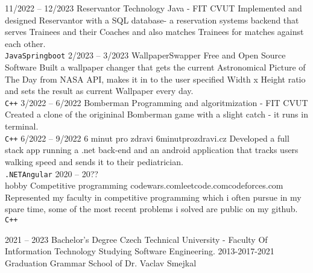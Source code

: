 \documentclass[9pt]{developercv} %
\begin{document}
\begin{entrylist}
	\entry
		{11/2022 -- 12/2023}
		{Reservantor}
		{Technology Java - FIT CVUT}
		{Implemented and designed Reservantor with a SQL database- a reservation systems backend that serves Trainees and their Coaches and also matches Trainees for matches against each other.\\ \texttt{Java}\slashsep\texttt{Springboot}}
	\entry
		{2/2023 -- 3/2023}
		{WallpaperSwapper}
		{Free and Open Source Software}
		{Built a wallpaper changer that gets the current Astronomical Picture of The Day from NASA API, makes it in to the user specified Width x Height ratio and sets the result as current Wallpaper every day.\\ \texttt{C++}}
		\entry
		{3/2022 -- 6/2022}
		{Bomberman}
		{Programming and algoritmization - FIT CVUT}
		{Created a clone of the origininal Bomberman game with a slight catch - it runs in terminal.\\ \texttt{C++}}
	\entry
		{6/2022 -- 9/2022}
		{6 minut pro zdravi}
		{6minutprozdravi.cz}
		{Developed a full stack app running a .net back-end and an android application that tracks users walking speed and sends it to their pediatrician.\\ \texttt{.NET}\slashsep\texttt{Angular}}
	\entry
		{2020 -- 20??\\\footnotesize{hobby}}
		{Competitive programming}
		{codewars.com\slashsep leetcode.com\slashsep codeforces.com}
		{Represented my faculty in competitive programming which i often pursue in my spare time, some of the most recent problems i solved are public on my github. \\ \texttt{C++}}
\end{entrylist}



\begin{entrylist}
	\entry
		{2021 -- 2023}
		{Bachelor's Degree}
		{Czech Technical University - Faculty Of Intformation Technology}
		{Studying Software Engineering.}
	\entry
		{2013-2017-2021}
		{Graduation}
		{Grammar School of Dr. Vaclav Smejkal}
		{}
\end{entrylist}

\end{document}
